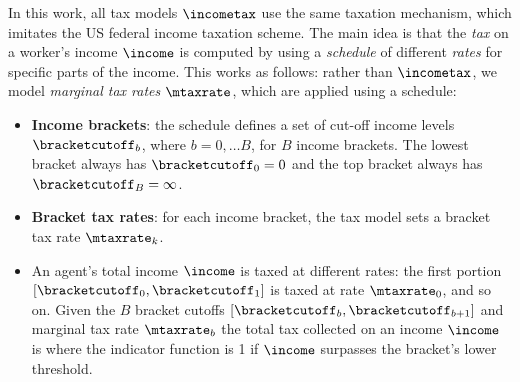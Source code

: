 In this work, all tax models $\incometax$ use the same taxation mechanism, which imitates the US federal income taxation scheme. The main idea is that the \emph{tax} on a worker's income $\income$ is computed by using a \emph{schedule} of different \emph{rates} for specific parts of the income.
This works as follows: rather than $\incometax$, we model \emph{marginal tax rates} $\mtaxrate$, which are applied using a schedule:
\begin{itemize}
 \item \textbf{Income brackets}: the schedule defines a set of cut-off income levels $\bracketcutoff_b$, where $b = 0, \ldots B$, for $B$ income brackets.
 The lowest bracket always has $\bracketcutoff_0 = 0$ and the top bracket always has $\bracketcutoff_B = \infty$.
 \item \textbf{Bracket tax rates}: for each income bracket, the tax model sets a bracket tax rate $\mtaxrate_k$.
 \item An agent's total income $\income$ is taxed at different rates: the first portion $[\bracketcutoff_0, \bracketcutoff_1]$ is taxed at rate $\mtaxrate_0$, and so on. Given the $B$ bracket cutoffs $[\bracketcutoff_b, \bracketcutoff_{b+1}]$ and marginal tax rate $\mtaxrate_b$ the total tax collected on an income $\income$ is
  where the indicator function is 1 if $\income$ surpasses the bracket's lower threshold.
 \end{itemize}
\fi


